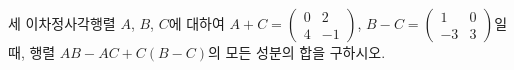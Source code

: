 \hspace*{2mm}\begin{minipage}[t]{\dimexpr\linewidth-2mm\relax}\vspace{0pt}
세 이차정사각행렬 $A$, $B$, $C$에 대하여 $A+C=\begin{pmatrix} 0 & 2 \\ 4 & -1 \end{pmatrix}$, $B-C=\begin{pmatrix} 1 & 0 \\ -3 & 3 \end{pmatrix}$일 때, 행렬 $AB-AC+C(B-C)$의 모든 성분의 합을 구하시오.\end{minipage}
